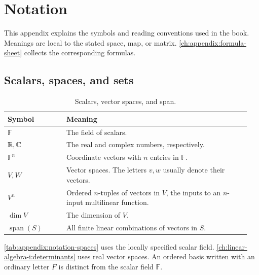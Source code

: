 \begingroup
\newcommand{\notationmeaning}[1]{{\raggedright#1\par}}
\chapter{Notation}
\label{ch:appendix:notation}
\raggedbottom

This appendix explains the symbols and reading conventions used in the book.
Meanings are local to the stated space, map, or matrix.
\autoref{ch:appendix:formula-sheet} collects the corresponding formulas.

\section{Scalars, spaces, and sets}
\label{sec:appendix:notation-spaces}

\begin{table}[htbp]
  \centering
  \renewcommand{\arraystretch}{1.2}
\begin{tabular}{@{}p{0.23\linewidth}p{0.72\linewidth}@{}}
  \toprule
  Symbol & Meaning \\
  \midrule
  \(\mathbb F\) & \notationmeaning{The field of scalars.} \\
  \(\mathbb{R},\mathbb{C}\) & \notationmeaning{The real and complex numbers, respectively.} \\
  \(\mathbb F^n\) & \notationmeaning{Coordinate vectors with \(n\) entries
    in \(\mathbb F\).} \\
  \(V,W\) & \notationmeaning{Vector spaces. The letters \(v,w\) usually denote
    their vectors.} \\
  \(V^n\) & \notationmeaning{Ordered \(n\)-tuples of vectors in \(V\),
    the inputs to an \(n\)-input multilinear function.} \\
  \(\dim V\) & \notationmeaning{The dimension of \(V\).} \\
  \(\operatorname{span}(S)\) & \notationmeaning{All finite linear
    combinations of vectors in \(S\).} \\
  \bottomrule
\end{tabular}
  \caption{Scalars, vector spaces, and span.}
  \label{tab:appendix:notation-spaces}
\end{table}

\autoref{tab:appendix:notation-spaces} uses the locally specified scalar
field. \autoref{ch:linear-algebra-i:determinants}
uses real vector spaces. An ordered basis written with an ordinary letter
\(F\) is distinct from the scalar field \(\mathbb F\).

